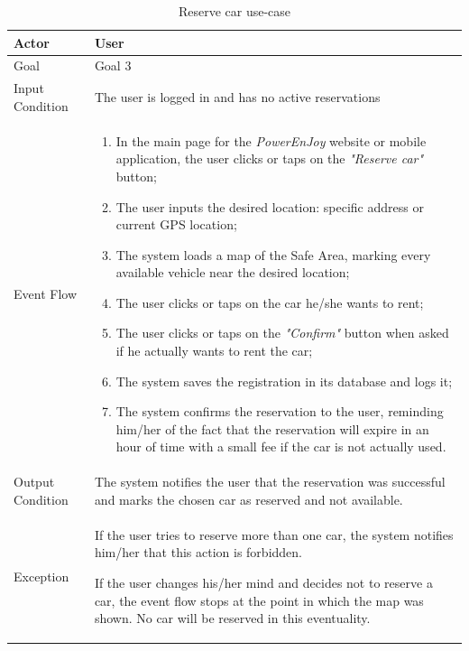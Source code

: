 \begin{table}[H]
\begin{center}
\begin{tabular}{p{} | p{}}
\hline
Actor & User\\
\hline
Goal & Goal 3\\
\hline
Input Condition & The user is logged in and has no active reservations\\
\hline
Event Flow & 
\begin{enumerate}
\item In the main page for the \emph{PowerEnJoy} website or mobile application, the user clicks or taps on the \emph{"Reserve car"} button;
\item The user inputs the desired location: specific address or current GPS location;
\item The system loads a map of the Safe Area, marking every available vehicle near the desired location;
\item The user clicks or taps on the car he/she wants to rent;
\item The user clicks or taps on the \emph{"Confirm"} button when asked if he actually wants to rent the car;
\item The system saves the registration in its database and logs it;
\item The system confirms the reservation to the user, reminding him/her of the fact that the reservation will expire in an hour of time with a small fee if the car is not actually used.
\end{enumerate} \\
\hline
Output Condition & The system notifies the user that the reservation was successful and marks the chosen car as reserved and not available.\\
\hline
Exception & If the user tries to reserve more than one car, the system notifies him/her that this action is forbidden.

If the user changes his/her mind and decides not to reserve a car, the event flow stops at the point in which the map was shown. No car will be reserved in this eventuality.\\
\hline
\end{tabular}
\end{center}
\caption{Reserve car use-case}
\label{reserve_car_uc}
\end{table}

